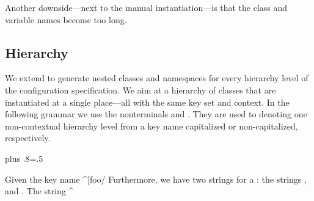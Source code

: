 Another downside---next to the manual instantiation---is that the class and variable names become too long.

\subsection{Hierarchy}
\label{sec:frontend-hierarchy}

We extend  to generate nested classes and namespaces for every hierarchy level of the configuration specification.
We aim at a hierarchy of classes that are instantiated at a single place---all with the same key set and context.
In the following grammar we use the nonterminals  and .
They are used to denoting one non-contextual hierarchy level from a key name capitalized or non-capitalized, respectively.%
{\parfillskip=0pt plus .8\textwidth \emergencystretch=.5\textwidth \par}

\begin{example}
Given the key name ^[foo/%
Furthermore, we have two strings for a : the strings , and .
The string ^%
\end{example}



